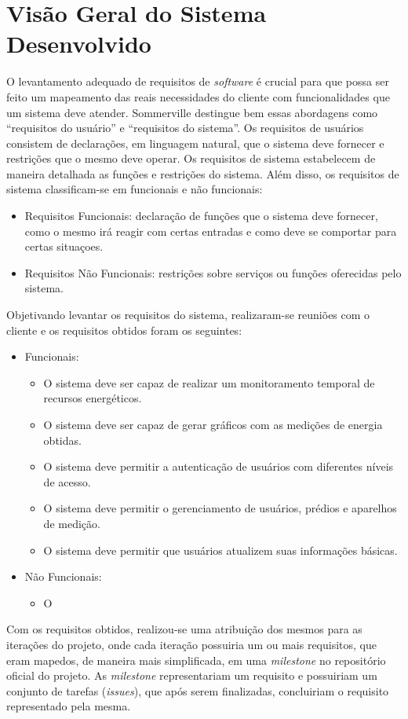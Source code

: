 \chapter{Visão Geral do Sistema Desenvolvido}

O levantamento adequado de requisitos de \textit{software} é crucial para
que possa ser feito um mapeamento das reais necessidades do cliente com
funcionalidades que um sistema deve atender. Sommerville \cite{sommerville_2006}
destingue bem essas abordagens como ``requisitos do usuário'' e ``requisitos do sistema''. Os requisitos de usuários consistem de declarações, em
linguagem natural, que o sistema deve fornecer e restrições que o mesmo deve
operar. Os requisitos de sistema estabelecem de maneira detalhada as
funções e restrições do sistema. Além disso, os requisitos de sistema
classificam-se em funcionais e não funcionais:

\begin{itemize}
    \item Requisitos Funcionais: declaração de funções que o sistema deve fornecer, como o mesmo irá reagir com certas entradas e como deve se comportar para certas situaçoes.
    \item Requisitos Não Funcionais: restrições sobre serviços ou funções oferecidas pelo sistema.
\end{itemize}

Objetivando levantar os requisitos do sistema, realizaram-se reuniões com o
cliente e os requisitos obtidos foram os seguintes:

\begin{itemize}
    \item Funcionais:
    \begin{itemize}
        \item O sistema deve ser capaz de realizar um monitoramento temporal de recursos energéticos.
        \item O sistema deve ser capaz de gerar gráficos com as medições de energia obtidas.
        \item O sistema deve permitir a autenticação de usuários com diferentes níveis de acesso.
        \item O sistema deve permitir o gerenciamento de usuários, prédios e aparelhos de medição.
        \item O sistema deve permitir que usuários atualizem suas informações básicas.
    \end{itemize}
    \item Não Funcionais:
    \begin{itemize}
        \item O
    \end{itemize}
\end{itemize}

Com os requisitos obtidos, realizou-se uma atribuição dos mesmos para
as iterações do projeto, onde cada iteração possuiria um ou mais requisitos,
que eram mapedos, de maneira mais simplificada, em uma \textit{milestone} no repositório oficial do projeto.
As \textit{milestone} representariam um requisito e possuiriam um conjunto
de tarefas (\textit{issues}), que após serem finalizadas, concluiriam
o requisito representado pela mesma.